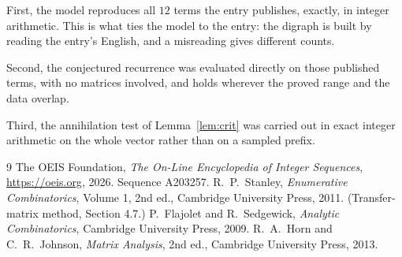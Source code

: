 \documentclass[11pt,a4paper]{article}
\theoremstyle{plain}
\theoremstyle{definition}
\begin{document}
First, the model reproduces all $12$ terms the entry publishes, exactly, in integer
arithmetic. This is what ties the model to the entry: the digraph is built by reading the
entry's English, and a misreading gives different counts.

Second, the conjectured recurrence was evaluated directly on those published terms, with no
matrices involved, and holds wherever the proved range and the data overlap.

Third, the annihilation test of Lemma~\ref{lem:crit} was carried out in exact integer
arithmetic on the whole vector rather than on a sampled prefix.

\begin{thebibliography}{9}
 The OEIS Foundation, \emph{The On-Line Encyclopedia of Integer
Sequences}, \url{https://oeis.org}, 2026. Sequence A203257.
 R.~P.~Stanley, \emph{Enumerative Combinatorics}, Volume 1, 2nd ed.,
Cambridge University Press, 2011. (Transfer-matrix method, Section 4.7.)
 P.~Flajolet and R.~Sedgewick, \emph{Analytic Combinatorics}, Cambridge
University Press, 2009.
 R.~A.~Horn and C.~R.~Johnson, \emph{Matrix Analysis}, 2nd ed., Cambridge
University Press, 2013.
\end{thebibliography}
\end{document}
